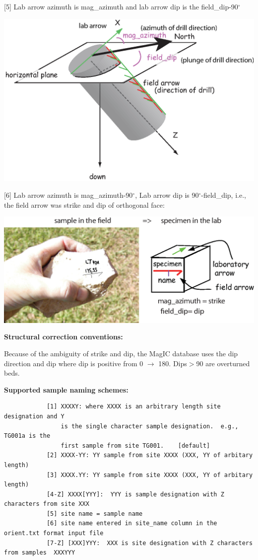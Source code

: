 \documentclass[11pt]{book}
\begin{document}
{{        [5]  Lab arrow azimuth is  mag\_azimuth and lab arrow dip is the  field\_dip-90$^{\circ}$

               \includegraphics[width=15cm]{EPSfiles/orcon_5.eps}


 [6] Lab arrow azimuth is mag\_azimuth-90$^{\circ}$, Lab arrow dip is 90$^{\circ}$-field\_dip, i.e., the field arrow was strike and dip of orthogonal face:

                \includegraphics[width=15cm]{EPSfiles/orcon_6.eps}
                }

{\bf Structural correction conventions:}


Because of the ambiguity of strike and dip, the MagIC database uses the dip direction and dip where dip is positive from 0 $\rightarrow$ 180. Dips$ > $90 are overturned beds.



{\bf Supported sample naming schemes:}

\begin{verbatim}
            [1] XXXXY: where XXXX is an arbitrary length site designation and Y
                is the single character sample designation.  e.g., TG001a is the
                first sample from site TG001.    [default]
            [2] XXXX-YY: YY sample from site XXXX (XXX, YY of arbitary length)
            [3] XXXX.YY: YY sample from site XXXX (XXX, YY of arbitary length)
            [4-Z] XXXX[YYY]:  YYY is sample designation with Z characters from site XXX
            [5] site name = sample name
            [6] site name entered in site_name column in the orient.txt format input file
            [7-Z] [XXX]YYY:  XXX is site designation with Z characters from samples  XXXYYY
\end{verbatim}

}
\end{document}
